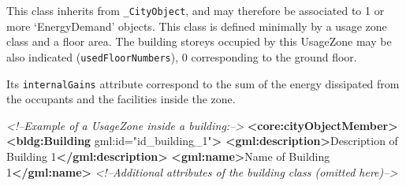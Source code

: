 \documentclass[a4paper,12pt]{article}
\newenvironment{Shaded}{}{}
\newcommand{\KeywordTok}[1]{\textcolor[rgb]{0.00,0.44,0.13}{\textbf{{#1}}}}
\newcommand{\StringTok}[1]{\textcolor[rgb]{0.25,0.44,0.63}{{#1}}}
\newcommand{\CommentTok}[1]{\textcolor[rgb]{0.38,0.63,0.69}{\textit{{#1}}}}
\newcommand{\OtherTok}[1]{\textcolor[rgb]{0.00,0.44,0.13}{{#1}}}
\newcommand{\NormalTok}[1]{{#1}}
\begin{document}
This class inherits from \texttt{\_CityObject}, and may therefore be
associated to 1 or more `EnergyDemand' objects. This class is defined
minimally by a usage zone class and a floor area. The building storeys
occupied by this UsageZone may be also indicated
(\texttt{usedFloorNumbers}), 0 corresponding to the ground floor.

Its \texttt{internalGains} attribute correspond to the sum of the energy
dissipated from the occupants and the facilities inside the zone.

\begin{Shaded}
\begin{Highlighting}[]
\CommentTok{<!--Example of a UsageZone inside a building:-->}
\KeywordTok{<core:cityObjectMember>}
    \KeywordTok{<bldg:Building}\OtherTok{ gml:id=}\StringTok{"id_building_1"}\KeywordTok{>}
        \KeywordTok{<gml:description>}\NormalTok{Description of Building 1}\KeywordTok{</gml:description>}
        \KeywordTok{<gml:name>}\NormalTok{Name of Building 1}\KeywordTok{</gml:name>}
        \CommentTok{<!--Additional attributes of the building class (omitted here)-->}


\end{Highlighting}
\end{Shaded}
\end{document}
